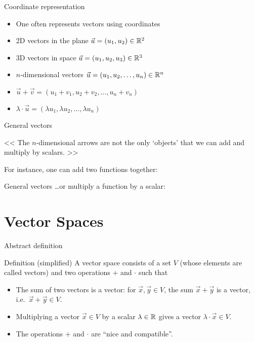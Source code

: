 \documentclass{beamer}
\begin{document}
\begin{frame}{Coordinate representation}
	\begin{itemize}
		\item One often represents vectors using coordinates
		\item 2D vectors in the plane $\vec{u} = (u_1,u_2) \in \mathbb{R}^2$
		\item 3D vectors in space $\vec{u} = (u_1,u_2,u_3) \in \mathbb{R}^3$
		\item $n$-dimensional vectors  $\vec{u} = (u_1,u_2,\dots, u_n) \in \mathbb{R}^n$
	\end{itemize}
	\vspace{1cm}
	\begin{itemize}
		\item $\vec{u} + \vec{v} = (u_1 + v_1,u_2 + v_2,\dots, u_n + v_n)$
		\item $\lambda \cdot \vec{u}= (\lambda u_1,\lambda u_2,\dots, \lambda u_n)$
	\end{itemize}
\end{frame}

\begin{frame}[t]{General vectors}
	\begin{center}
		<< The $n$-dimensional arrows are not the only `objects' that we can add and multiply by scalars. >>
	\end{center}

	For instance, one can add two functions together:
\end{frame}

\begin{frame}[t]{General vectors}
	\dots or multiply a function by a scalar:
\end{frame}

\section{Vector Spaces}

\begin{frame}{Abstract definition}
	\begin{block}{Definition (simplified)}
		A vector space consists of a set $V$ (whose elements are called vectors) and two operations $+$ and $\cdot$ such that
		\begin{itemize}
			\item The sum of two vectors is a vector: for $\vec{x}, \vec{y} \in V$, the sum $\vec{x}+\vec{y}$ is a vector, i.e.\ $\vec{x} + \vec{y} \in V$.
			\item Multiplying a vector $\vec{x} \in V$ by a scalar $\lambda \in \mathbb{R}$ gives a vector $\lambda \cdot \vec{x} \in V$.
			\item The operations $+$ and $\cdot$ are ``nice and compatible''.
		\end{itemize}
	\end{block}
\end{frame}
\end{document}
